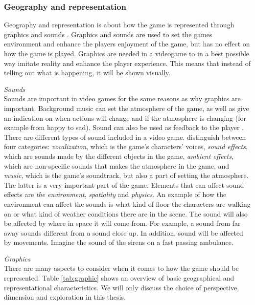\subsubsection{Geography and representation}
\label{sec:georep}
Geography and representation is about how the game is represented through graphics and sounds \cite{understandingvg}. Graphics and sounds are used to set the games environment and enhance the players enjoyment of the game, but has no effect on how the game is played. Graphics are needed in a videogame to in a best possible way imitate reality and enhance the player experience. This means that instead of telling out what is happening, it will be shown visually. 

\emph{Sounds}\\
Sounds are important in video games for the same reasons as why graphics are important. Background music can set the atmosphere of the game, as well as give an indication on when actions will change and if the atmosphere is changing (for example from happy to sad). Sound can also be used as feedback to the player \cite{umlapproach}. There are different types of sound included in a  video game. \cite{understandingvg} distinguish between four categories:
\emph{vocalization}, which is the game’s characters’ voices,
\emph{sound effects}, which are sounds made by the different objects in the game, \emph{ambient effects}, which are non-specific sounds that makes the atmosphere in the game, and \emph{music}, which is the game’s soundtrack, but also a part of setting the atmosphere. The latter is a very important part of the game. Elements that can affect sound effects are \emph{the environment}, \emph{spatiality} and \emph{physics}. An example of how the environment can affect the sounds is what kind of floor the characters are walking on or what kind of weather conditions there are in the scene. The sound will also be affected by where in space it will come from. For example, a sound from far away sounds different from a sound close up. In addition, sound will be affected by movements. Imagine the sound of the sirens on a fast passing ambulance.

\emph{Graphics}\\
There are many aspects to consider when it comes to how the game should be represented. Table \ref{tab:graphic} shows an overview of basic geographical and representational characteristics. We will only discuss the choice of perspective, dimension and exploration in this thesis. 

